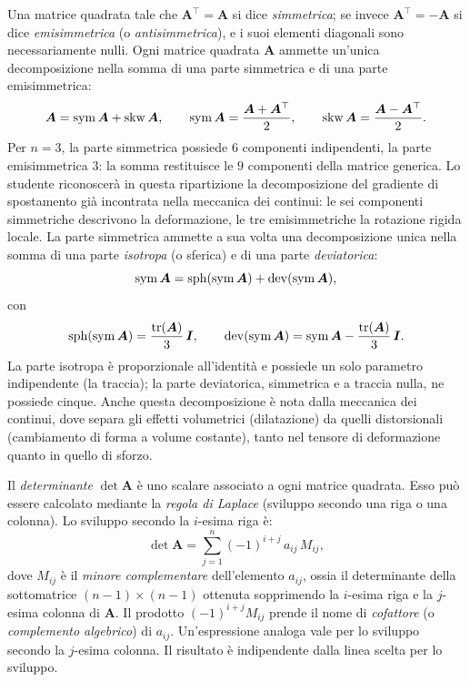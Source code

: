 Una matrice	quadrata tale che $\bm{A}^\top = \bm{A}$ si dice \textit{simmetrica};
se invece $\bm{A}^\top = -\bm{A}$ si dice \textit{emisimmetrica}
(o \textit{antisimmetrica}), e i suoi elementi diagonali sono necessariamente nulli.	
Ogni matrice quadrata $\bm{A}$ ammette un'unica decomposizione nella somma
di una parte simmetrica e di una parte emisimmetrica:
\begin{equation}
	\bm{A} = \operatorname{sym}\bm{A} + \operatorname{skw}\bm{A},
	\qquad
	\operatorname{sym}\bm{A} = \dfrac{\bm{A}+\bm{A}^\top}{2},
	\qquad
	\operatorname{skw}\bm{A} = \dfrac{\bm{A}-\bm{A}^\top}{2}.
\end{equation}
Per $n = 3$, la parte simmetrica possiede $6$ componenti
indipendenti, la parte emisimmetrica $3$: la somma restituisce
le $9$ componenti della matrice generica. Lo studente
riconoscerà in questa ripartizione la decomposizione del
gradiente di spostamento già incontrata nella meccanica dei
continui: le sei componenti simmetriche descrivono la
deformazione, le tre emisimmetriche la rotazione rigida locale.
La parte simmetrica ammette a sua volta una decomposizione
unica nella somma di una parte \textit{isotropa} (o sferica)
e di una parte \textit{deviatorica}:
\begin{equation}
	\operatorname{sym}\bm{A} = \operatorname{sph}(\operatorname{sym}\bm{A}) + \operatorname{dev}(\operatorname{sym}\bm{A}),
\end{equation}
con
\begin{equation}
	\operatorname{sph}(\operatorname{sym}\bm{A})
	= \frac{\operatorname{tr}(\bm{A})}{3}\,\bm{I},
	\qquad
	\operatorname{dev}(\operatorname{sym}\bm{A})
	= \operatorname{sym}\bm{A}
	- \frac{\operatorname{tr}(\bm{A})}{3}\,\bm{I}.
\end{equation}
La parte isotropa è proporzionale all'identità e possiede un
solo parametro indipendente (la traccia); la parte deviatorica,
simmetrica e a traccia nulla, ne possiede cinque. Anche questa
decomposizione è nota dalla meccanica dei continui, dove separa
gli effetti volumetrici (dilatazione) da quelli distorsionali
(cambiamento di forma a volume costante), tanto nel tensore di
deformazione quanto in quello di sforzo.

Il \textit{determinante} $\det\bm{A}$ \`e uno scalare associato a ogni matrice
quadrata. Esso pu\`o essere calcolato mediante la \textit{regola di Laplace}
(sviluppo secondo una riga o una colonna). Lo sviluppo secondo la $i$-esima
riga \`e:
\begin{equation}\label{eq:laplace}
	\det\bm{A} = \sum_{j=1}^{n} (-1)^{i+j}\, a_{ij}\, M_{ij},
\end{equation}
dove $M_{ij}$ \`e il \textit{minore complementare} dell'elemento $a_{ij}$,
ossia il determinante della sottomatrice $(n{-}1)\times(n{-}1)$ ottenuta
sopprimendo la $i$-esima riga e la $j$-esima colonna di $\bm{A}$. Il prodotto
$(-1)^{i+j} M_{ij}$ prende il nome di \textit{cofattore} (o \textit{complemento
	algebrico}) di $a_{ij}$. Un'espressione analoga vale per lo sviluppo secondo
la $j$-esima colonna. Il risultato \`e indipendente dalla linea scelta per lo
sviluppo.

